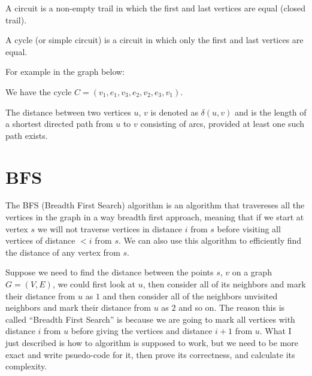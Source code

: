 \documentclass[11pt,a4paper]{article}
\begin{document}
\begin{definition}[Circuit]
A circuit is a non-empty trail in which the first and last 
vertices are equal (closed trail).
\end{definition}

\begin{definition}[Cycle]
A cycle (or simple circuit) is a circuit in which only 
the first and last vertices are equal.
\end{definition}

For example in the graph below:
\begin{center}
\end{center}

We have the cycle $C = (v_1,e_1,v_3,e_2,v_2,e_3,v_1)$.

\begin{definition}
The distance between two vertices $u$, $v$ is denoted as 
$\delta(u,v)$ and is the length of a shortest directed path from 
$u$ to $v$ consisting of arcs, provided at least one such path exists.
\end{definition}

\newpage

\section{BFS}
The BFS (Breadth First Search) algorithm is an algorithm that travereses
all the vertices in the graph in a way breadth first approach, meaning
that if we start at vertex $s$ we will not traverse vertices in distance
$i$ from $s$ before visiting all vertices of distance $<i$ from $s$.
We can also use this algorithm to efficiently find the distance of
any vertex from $s$. 

Suppose we need to find the distance between the points $s$, $v$ on a 
graph $G=(V,E)$, we could first look at $u$, then consider all of its 
neighbors and mark their distance from $u$ as $1$ and then consider all 
of the neighbors unvisited neighbors and mark their distance from $u$ as 
$2$ and so on. The reason this is called ``Breadth First Search'' is 
because we are going to mark
all vertices with distance $i$ from $u$ before giving the vertices
and distance $i+1$ from $u$. What I just described is how to algorithm
is supposed to work, but we need to be more exact and write psuedo-code
for it, then prove its correctness, and calculate its complexity.
\end{document}
